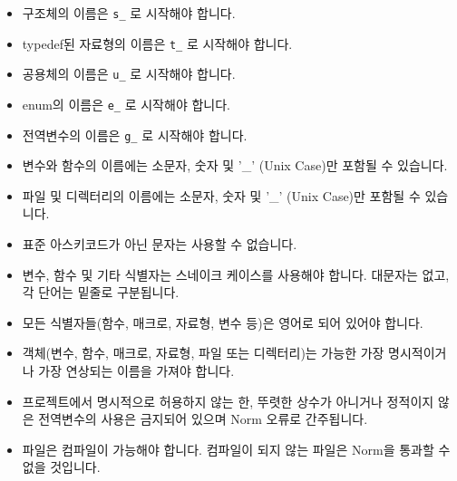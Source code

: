 \documentclass{42-ko}
\begin{document}
        \begin{itemize}

            \item 구조체의 이름은
                \texttt{s\_} 로 시작해야 합니다.

            \item typedef된 자료형의 이름은
                \texttt{t\_} 로 시작해야 합니다.

            \item 공용체의 이름은 \texttt{u\_} 로 시작해야 합니다.

            \item enum의 이름은 \texttt{e\_} 로 시작해야 합니다.

            \item 전역변수의 이름은 \texttt{g\_} 로 시작해야 합니다.

            \item 변수와 함수의 이름에는 소문자, 숫자 및 '\_' (Unix Case)만
                포함될 수 있습니다.

            \item 파일 및 디렉터리의 이름에는 소문자, 숫자 및 '\_' (Unix Case)만 
                포함될 수 있습니다.

            \item 표준 아스키코드가 아닌 문자는 사용할 수 없습니다.

            \item 변수, 함수 및 기타 식별자는 스네이크 케이스를 사용해야 합니다.
                대문자는 없고, 각 단어는 밑줄로 구분됩니다.

            \item 모든 식별자들(함수, 매크로, 자료형, 변수 등)은 
                영어로 되어 있어야 합니다.

            \item 객체(변수, 함수, 매크로, 자료형, 파일 또는 디렉터리)는 
                가능한 가장 명시적이거나 가장 연상되는 이름을 가져야 합니다.

            \item 프로젝트에서 명시적으로 허용하지 않는 한, 뚜렷한 상수가 아니거나 
                정적이지 않은 전역변수의 사용은 금지되어 있으며 Norm 오류로 간주됩니다.

            \item 파일은 컴파일이 가능해야 합니다. 컴파일이 되지 않는 파일은
                Norm을 통과할 수 없을 것입니다.
        \end{itemize}
\newpage
\end{document}
